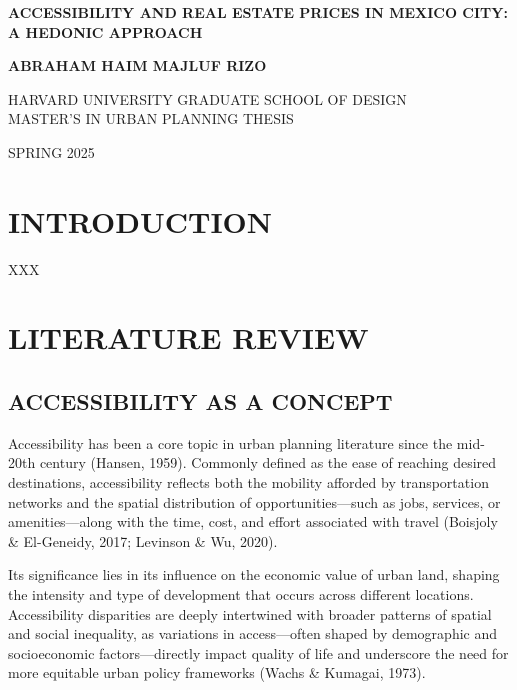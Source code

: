 \documentclass[
  12pt,
]{report}
\author{}
\date{}
\begin{document}
\begin{center}

\thispagestyle{empty}

\vspace*{2in}

\Huge \textbf{ACCESSIBILITY AND REAL ESTATE PRICES IN MEXICO CITY: A HEDONIC APPROACH}

\vspace*{2in}

\Large \textbf{ABRAHAM HAIM MAJLUF RIZO}

\vspace*{0.25in}

HARVARD UNIVERSITY GRADUATE SCHOOL OF DESIGN\\[0em]
MASTER'S IN URBAN PLANNING THESIS

\vspace*{0.25in}

SPRING 2025

\end{center}

\chapter{INTRODUCTION}\label{introduction}

XXX

\newpage

\chapter{LITERATURE REVIEW}\label{literature-review}

\section{ACCESSIBILITY AS A CONCEPT}\label{accessibility-as-a-concept}

Accessibility has been a core topic in urban planning literature since
the mid-20th century (Hansen, 1959). Commonly defined as the ease of
reaching desired destinations, accessibility reflects both the mobility
afforded by transportation networks and the spatial distribution of
opportunities---such as jobs, services, or amenities---along with the
time, cost, and effort associated with travel (Boisjoly \& El-Geneidy,
2017; Levinson \& Wu, 2020).

Its significance lies in its influence on the economic value of urban
land, shaping the intensity and type of development that occurs across
different locations. Accessibility disparities are deeply intertwined
with broader patterns of spatial and social inequality, as variations in
access---often shaped by demographic and socioeconomic
factors---directly impact quality of life and underscore the need for
more equitable urban policy frameworks (Wachs \& Kumagai, 1973).
\end{document}
